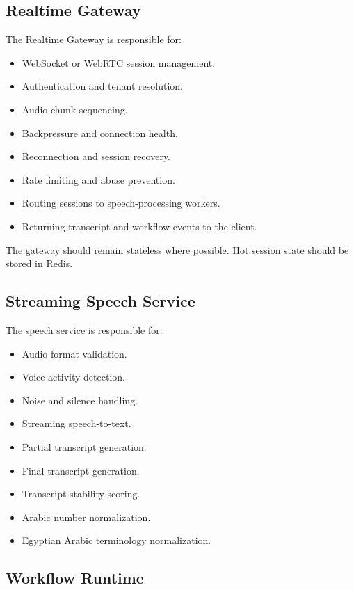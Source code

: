 \documentclass[11pt,a4paper]{article}
\begin{document}
\subsection{Realtime Gateway}

The Realtime Gateway is responsible for:

\begin{itemize}
\item WebSocket or WebRTC session management.
\item Authentication and tenant resolution.
\item Audio chunk sequencing.
\item Backpressure and connection health.
\item Reconnection and session recovery.
\item Rate limiting and abuse prevention.
\item Routing sessions to speech-processing workers.
\item Returning transcript and workflow events to the client.
\end{itemize}

The gateway should remain stateless where possible. Hot session state
should be stored in Redis.

\subsection{Streaming Speech Service}

The speech service is responsible for:

\begin{itemize}
\item Audio format validation.
\item Voice activity detection.
\item Noise and silence handling.
\item Streaming speech-to-text.
\item Partial transcript generation.
\item Final transcript generation.
\item Transcript stability scoring.
\item Arabic number normalization.
\item Egyptian Arabic terminology normalization.
\end{itemize}

\subsection{Workflow Runtime}
\end{document}
